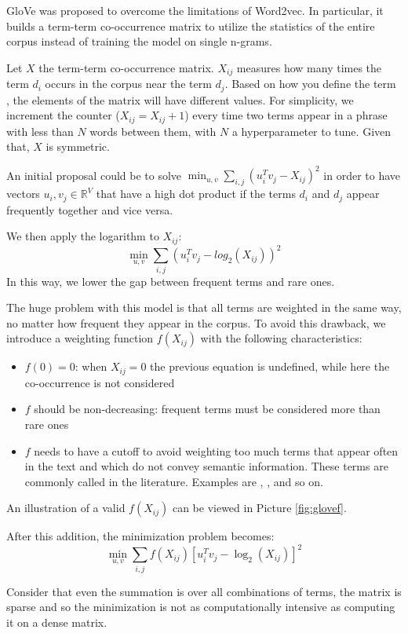 GloVe was proposed to overcome the limitations of Word2vec.
In particular, it builds a term-term co-occurrence matrix
to utilize the statistics of the entire corpus
instead of training the model on single n-grams.

Let  $X$ the term-term co-occurrence matrix.
$X_{ij}$ measures how many times the term $d_i$ occurs in the corpus near
the term $d_j$. Based on how you define the term ,
the elements of the matrix will have different values.
For simplicity, we increment the counter ($X_{ij} = X_{ij} + 1$) every time
two terms appear in a phrase with less than $N$ words between them, with $N$ a
hyperparameter to tune. Given that, $X$ is symmetric.

An initial proposal could be to solve $\min_{u,v} \sum_{i,j} (u_i^T v_j - X_{ij})^2$
in order to have vectors $u_i, v_j \in \mathbb{R}^V$ that have a high dot product if the terms $d_i$ and $d_j$
appear frequently together and vice versa.

We then apply the logarithm to $X_{ij}$:
$$\min_{u,v} \sum_{i,j} (u_i^T v_j - log_2(X_{ij}))^2$$
In this way, we lower the gap between frequent terms and rare ones.

The huge problem with this model is that all terms are weighted in the same way,
no matter how frequent they appear in the corpus.
To avoid this drawback, we introduce a weighting function $f(X_{ij})$ with the following characteristics:
\begin{itemize}
    \item $f(0) = 0$: when $X_{ij} = 0$ the previous equation is undefined, while here the co-occurrence is not considered
    \item $f$ should be non-decreasing: frequent terms must be considered more than rare ones
    \item $f$ needs to have a cutoff to avoid weighting too much terms that appear often in the text and which do not convey semantic information.
          These terms are commonly called  in the literature. Examples are , ,  and so on.
\end{itemize}
An illustration of a valid $f(X_{ij})$ can be viewed in Picture \ref{fig:glovef}.

After this addition, the minimization problem becomes:
$$ \min_{u,v} \sum_{i,j} f(X_{ij}) [u_i^T v_j - \log_2(X_{ij})]^2 $$

Consider that even the summation is over all combinations of terms,
the matrix is sparse and so the minimization is not as computationally intensive
as computing it on a dense matrix.


